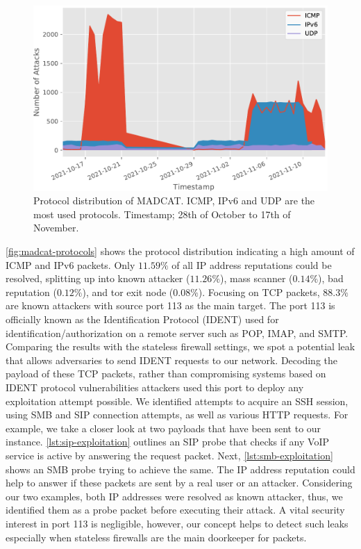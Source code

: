 \begin{figure}[ht]
    \centering
    \includegraphics[width=\textwidth]{figures/madcat-protocol-usage.pdf}
    \caption[Protocol distribution of MADCAT]{Protocol distribution of MADCAT. ICMP, IPv6 and UDP are the most used protocols. Timestamp; 28th of October to 17th of November.}
    \label{fig:madcat-protocols}
\end{figure}

\autoref{fig:madcat-protocols} shows the protocol distribution indicating a high amount of ICMP and IPv6 packets.
Only $11.59\%$ of all IP address reputations could be resolved, splitting up into known attacker ($11.26\%$), mass scanner ($0.14\%$), bad reputation ($0.12\%$), and tor exit node ($0.08\%$).
Focusing on TCP packets, $88.3\%$ are known attackers with source port 113 as the main target.
The port 113 is officially known as the Identification Protocol (IDENT)\cite{rfc1413} used for identification/authorization on a remote server such as POP, IMAP, and SMTP.
Comparing the results with the stateless firewall settings, we spot a potential leak that allows adversaries to send IDENT requests to our network.
Decoding the payload of these TCP packets, rather than compromising systems based on IDENT protocol vulnerabilities attackers used this port to deploy any exploitation attempt possible.
We identified attempts to acquire an SSH session, using SMB and SIP connection attempts, as well as various HTTP requests.
For example, we take a closer look at two payloads that have been sent to our instance.
\autoref{lst:sip-exploitation} outlines an SIP probe that checks if any VoIP service is active by answering the request packet.
Next, \autoref{lst:smb-exploitation} shows an SMB probe trying to achieve the same.
The IP address reputation could help to answer if these packets are sent by a real user or an attacker.
Considering our two examples, both IP addresses were resolved as known attacker, thus, we identified them as a probe packet before executing their attack.
A vital security interest in port 113 is negligible, however, our concept helps to detect such leaks especially when stateless firewalls are the main doorkeeper for packets.

